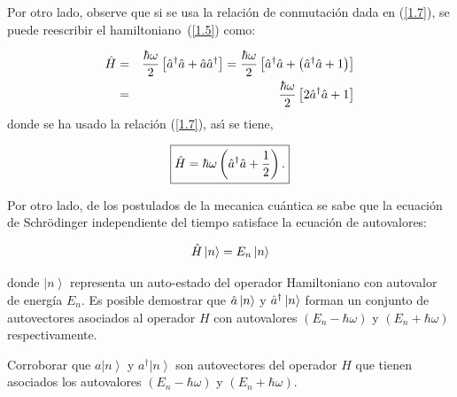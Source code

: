 \begin{solution}
\end{solution}

\noindent
Por otro lado, observe que si se usa la relaci\'{o}n de conmutaci\'{o}n dada en (\ref{1.7}), se puede reescribir el hamiltoniano\ (\ref{1.5}) como:

\begin{eqnarray*}
\hat{H} &=&\frac{\hbar \omega }{2}\left[ \hat{a}^{\dagger }\hat{a}+\hat{a} \hat{a}^{\dagger }\right] =\frac{\hbar \omega }{2}\left[ \hat{a}^{\dagger }\hat{a}+\left( \hat{a}^{\dagger } \hat{a} + 1\right) \right]
\\
&=&\frac{\hbar \omega }{2}\left[ 2\hat{a}^{\dagger }\hat{a}+1\right]
\end{eqnarray*}%
donde se ha usado la relaci\'{o}n (\ref{1.7}), as\'{\i} se tiene,

\begin{equation}
\boxed{
\hat{H}=\hbar \omega \left( \hat{a}^{\dagger} \hat{a}+\frac{1}{2}\right)  .
}
\label{1.10}
\end{equation}

\noindent
Por otro lado, de los postulados de la mecanica cu\'{a}ntica se sabe que la ecuaci\'{o}n de Schr\"{o}dinger independiente del tiempo satisface la ecuaci\'{o}n de autovalores:

\begin{equation}
\hat{H} \left\vert n\right\rangle =E_{n}\left\vert n\right\rangle  \label{1.11}
\end{equation}

\noindent
donde $\left\vert n\right\rangle $ representa un auto-estado del operador Hamiltoniano con autovalor de energía $E_{n}$.
Es posible demostrar que $\hat{a} \left\vert n\right\rangle $ y $\hat{a}^{\dagger} \left\vert n\right\rangle $ forman un conjunto de autovectores asociados al operador $H$ con autovalores $\left( E_{n}-\hbar \omega \right) $ y $\left( E_{n}+\hbar \omega \right) $ respectivamente.

\vspace{0.3cm}
\begin{exercise}
Corroborar que $a\left\vert n\right\rangle $ y $a^{\dagger }\left\vert
n\right\rangle $ son autovectores del operador $H$ que tienen asociados los
autovalores $\left( E_{n}-\hbar \omega \right) $ y $\left( E_{n}+\hbar
\omega \right) $.
\end{exercise}
 
